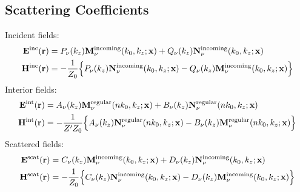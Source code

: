 \documentclass[letterpaper]{article}
\begin{document}
\subsection{Scattering Coefficients}

Incident fields:
\begin{align*}
 \mathbf{E}^{\hbox{\scriptsize{inc}}}(\mathbf{r}) 
   &=   P_\nu(k_z) \mathbf{M}^{\hbox{\scriptsize{incoming}}}_\nu(k_0, k_z; \mathbf{x})
      + Q_\nu(k_z) \mathbf{N}^{\hbox{\scriptsize{incoming}}}_\nu(k_0, k_z; \mathbf{x})
\\
 \mathbf{H}^{\hbox{\scriptsize{inc}}}(\mathbf{r})
   &= -\frac{1}{Z_0}
      \Big\{
      P_\nu(k_z) \mathbf{N}^{\hbox{\scriptsize{incoming}}}_\nu(k_0, k_z; \mathbf{x})
    - Q_\nu(k_z) \mathbf{M}^{\hbox{\scriptsize{incoming}}}_\nu(k_0, k_z; \mathbf{x})
      \Big\}
\\
\end{align*}
Interior fields:
\begin{align*}
 \mathbf{E}^{\hbox{\scriptsize{int}}}(\mathbf{r}) 
   &=   A_\nu(k_z) \mathbf{M}^{\hbox{\scriptsize{regular}}}_\nu(nk_0, k_z; \mathbf{x})
      + B_\nu(k_z) \mathbf{N}^{\hbox{\scriptsize{regular}}}_\nu(nk_0, k_z; \mathbf{x})
\\
 \mathbf{H}^{\hbox{\scriptsize{int}}}(\mathbf{r})
   &= -\frac{1}{Z^\prime Z_0}
      \Big\{
      A_\nu(k_z) \mathbf{N}^{\hbox{\scriptsize{regular}}}_\nu(n k_0, k_z; \mathbf{x})
    - B_\nu(k_z) \mathbf{M}^{\hbox{\scriptsize{regular}}}_\nu(n k_0, k_z; \mathbf{x})
      \Big\}
\\
\end{align*}
Scattered fields:
\begin{align*}
 \mathbf{E}^{\hbox{\scriptsize{scat}}}(\mathbf{r}) 
   &=   C_\nu(k_z) \mathbf{M}^{\hbox{\scriptsize{incoming}}}_\nu(k_0, k_z; \mathbf{x})
      + D_\nu(k_z) \mathbf{N}^{\hbox{\scriptsize{incoming}}}_\nu(k_0, k_z; \mathbf{x})
\\
 \mathbf{H}^{\hbox{\scriptsize{scat}}}(\mathbf{r})
   &= -\frac{1}{Z_0}
      \Big\{
      C_\nu(k_z) \mathbf{N}^{\hbox{\scriptsize{incoming}}}_\nu(k_0, k_z; \mathbf{x})
    - D_\nu(k_z) \mathbf{M}^{\hbox{\scriptsize{incoming}}}_\nu(k_0, k_z; \mathbf{x})
      \Big\}
\end{align*}
\end{document}
